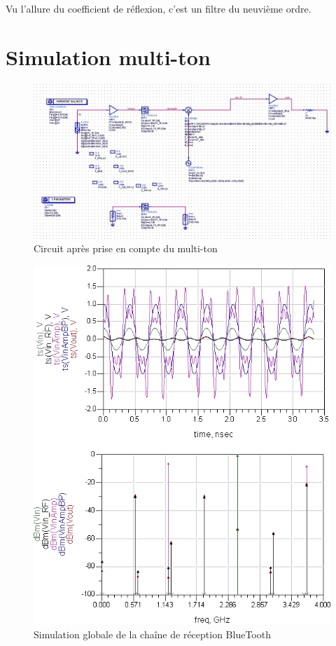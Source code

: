 \documentclass[10pt]{article}
\begin{document}
Vu l’allure du coefficient de réflexion, c’est un filtre du neuvième ordre.

\section{Simulation multi-ton}

\begin{figure}
    \begin{center}
        \includegraphics[width=15cm]{p10_circuit}
    \end{center}
    \caption{Circuit après prise en compte du multi-ton}
\end{figure}

\begin{figure}
    \begin{center}
        \includegraphics{p10_simu}
    \end{center}
    \caption{Simulation globale de la chaîne de réception BlueTooth}
\end{figure}
\end{document}
